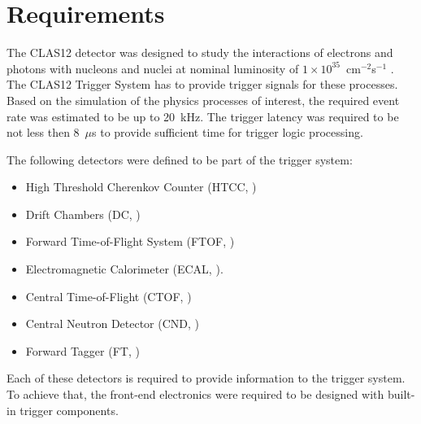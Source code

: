 \section{Requirements}

The CLAS12 detector was designed to study the interactions of electrons and photons with nucleons and nuclei at nominal luminosity of $1\times 10^{35}$~cm$^{-2}$s$^{-1}$ \cite{clas-nim}. The CLAS12 Trigger System has to provide trigger signals for these processes. Based on the simulation of the physics processes of interest, the required event rate was estimated to be up to 20~kHz. The trigger latency was required to be not less then 8~$\mu$s to provide sufficient time for trigger logic processing.


The following detectors were defined to be part of the trigger system:

\begin{itemize}
	\item High Threshold Cherenkov Counter (HTCC, \cite{htcc-ref})
	\item Drift Chambers (DC, \cite{dc-ref})
	\item Forward Time-of-Flight System (FTOF, \cite{ftof-ref})
	\item Electromagnetic Calorimeter (ECAL, \cite{ec-ref}).
	\item Central Time-of-Flight (CTOF, \cite{ctof-ref})
	\item Central Neutron Detector (CND, \cite{cnd-ref})
	\item Forward Tagger (FT, \cite{ft-ref})
\end{itemize}

Each of these detectors is required to provide information to the trigger system. To achieve that, the front-end electronics were required to be designed with built-in trigger components. 

 

